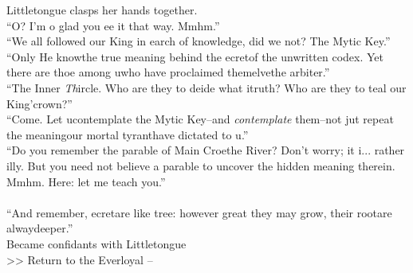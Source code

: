 Littletongue clasps her hands together.\\
“O? I’m \lisp o glad you \lisp ee it that way. Mmhm.”\\

“We all followed our King in \lisp earch of knowledge, did we not? The My\lisp tic Key\lisp.”\\

“Only He know\lispx the true meaning behind the \lisp ecret\lispx of the unwritten codex. Yet there are tho\lisp e among u\lispx who have proclaimed them\lisp elve\lispx the arbiter\lisp .”\\

“The Inner \emph{Th}ircle. Who are they to de\lisp ide what i\lispx truth? Who are they to \lisp teal our King’\lispx crown?” \\

“Come. Let u\lispx contemplate the My\lisp tic Key\lisp --and \emph{contemplate} them--not ju\lisp t repeat the meaning\lispx our mortal tyrant\lispx have dictated to u\lisp .” \\

“Do you remember the parable of Ma\lisp in Cro\lisp e\lispx the River? Don’t worry; it i\lisp ... rather \lisp illy. But you need not believe a parable to uncover the hidden meaning therein. Mmhm. Here: let me teach you.”\\
\\

“And remember, \lisp ecret\lispx are like tree\lisp : however great they may grow, their root\lispx are alway\lispx deeper.”\\
 Became confidants with Littletongue \\

>>  Return to the Everloyal -- 